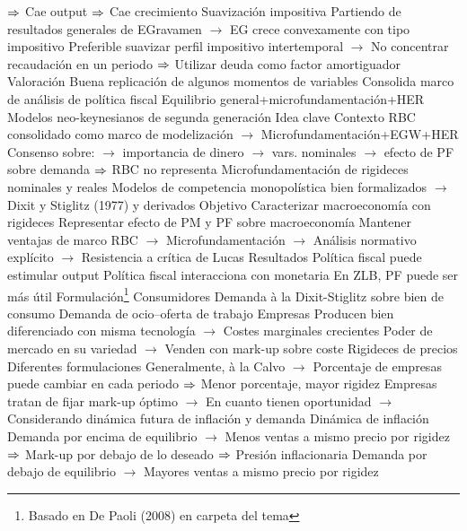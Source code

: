 \documentclass{nuevotema}
\begin{document}
\begin{esquemal}
				\4[] $\Rightarrow$ Cae output
				\4[] $\Rightarrow$ Cae crecimiento
				\4 Suavización impositiva
				\4[] Partiendo de resultados generales de EGravamen
				\4[] $\to$ EG crece convexamente con tipo impositivo
				\4[] Preferible suavizar perfil impositivo intertemporal
				\4[] $\to$ No concentrar recaudación en un periodo
				\4[] $\Rightarrow$ Utilizar deuda como factor amortiguador
			\3 Valoración
				\4 Buena replicación de algunos momentos de variables
				\4 Consolida marco de análisis de política fiscal
				\4[] Equilibrio general+microfundamentación+HER
		\2 Modelos neo-keynesianos de segunda generación
			\3 Idea clave
				\4 Contexto
				\4[] RBC consolidado como marco de modelización
				\4[] $\to$ Microfundamentación+EGW+HER
				\4[] Consenso sobre:
				\4[] $\to$ importancia de dinero
				\4[] $\to$ vars. nominales
				\4[] $\to$ efecto de PF sobre demanda
				\4[] $\Rightarrow$ RBC no representa
				\4[] Microfundamentación de rigideces nominales y reales
				\4[] Modelos de competencia monopolística bien formalizados
				\4[] $\to$ Dixit y Stiglitz (1977) y derivados
				\4 Objetivo
				\4[] Caracterizar macroeconomía con rigideces
				\4[] Representar efecto de PM y PF sobre macroeconomía
				\4[] Mantener ventajas de marco RBC
				\4[] $\to$ Microfundamentación
				\4[] $\to$ Análisis normativo explícito
				\4[] $\to$ Resistencia a crítica de Lucas
				\4 Resultados
				\4[] Política fiscal puede estimular output
				\4[] Política fiscal interacciona con monetaria
				\4[] En ZLB, PF puede ser más útil
			\3 Formulación\footnote{Basado en De Paoli (2008) en carpeta del tema}
				\4 Consumidores
				\4[] Demanda à la Dixit-Stiglitz sobre bien de consumo
				\4[] Demanda de ocio--oferta de trabajo
				\4 Empresas
				\4[] Producen bien diferenciado con misma tecnología
				\4[] $\to$ Costes marginales crecientes
				\4[] Poder de mercado en su variedad
				\4[] $\to$ Venden con mark-up sobre coste
				\4 Rigideces de precios
				\4[] Diferentes formulaciones
				\4[] Generalmente, à la Calvo
				\4[] $\to$ Porcentaje de empresas puede cambiar en cada periodo
				\4[] $\Rightarrow$ Menor porcentaje, mayor rigidez
				\4[] Empresas tratan de fijar mark-up óptimo
				\4[] $\to$ En cuanto tienen oportunidad
				\4[] $\to$ Considerando dinámica futura de inflación y demanda
				\4 Dinámica de inflación
				\4[] Demanda por encima de equilibrio
				\4[] $\to$ Menos ventas a mismo precio por rigidez
				\4[] $\Rightarrow$ Mark-up por debajo de lo deseado
				\4[] $\Rightarrow$ Presión inflacionaria
				\4[] Demanda por debajo de equilibrio
				\4[] $\to$ Mayores ventas a mismo precio por rigidez

\end{esquemal}
\end{document}
